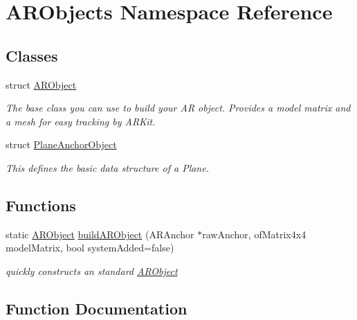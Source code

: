 \hypertarget{namespace_a_r_objects}{}\section{A\+R\+Objects Namespace Reference}
\label{namespace_a_r_objects}
\subsection*{Classes}
\begin{DoxyCompactItemize}
\item 
struct \hyperlink{struct_a_r_objects_1_1_a_r_object}{A\+R\+Object}
\begin{DoxyCompactList}\small\item\em The base class you can use to build your AR object. Provides a model matrix and a mesh for easy tracking by A\+R\+Kit. \end{DoxyCompactList}\item 
struct \hyperlink{struct_a_r_objects_1_1_plane_anchor_object}{Plane\+Anchor\+Object}
\begin{DoxyCompactList}\small\item\em This defines the basic data structure of a Plane. \end{DoxyCompactList}\end{DoxyCompactItemize}
\subsection*{Functions}
\begin{DoxyCompactItemize}
\item 
static \hyperlink{struct_a_r_objects_1_1_a_r_object}{A\+R\+Object} \hyperlink{namespace_a_r_objects_a3721dd2b55c8de28aa62371a1d345a83}{build\+A\+R\+Object} (A\+R\+Anchor $\ast$raw\+Anchor, of\+Matrix4x4 model\+Matrix, bool system\+Added=false)
\begin{DoxyCompactList}\small\item\em quickly constructs an standard \hyperlink{struct_a_r_objects_1_1_a_r_object}{A\+R\+Object} \end{DoxyCompactList}\end{DoxyCompactItemize}


\subsection{Function Documentation}
\mbox{\label{namespace_a_r_objects_a3721dd2b55c8de28aa62371a1d345a83}} 
